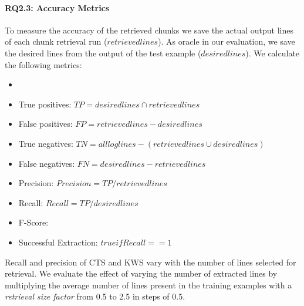 \documentclass[\myrootdir/main.tex]{subfiles}
\begin{document}
\paragraph{RQ2.3: Accuracy Metrics}
To measure the accuracy of the retrieved chunks we save the actual output lines of each chunk retrieval run ($retrievedlines$).
As oracle in our evaluation, we save the desired lines from the output of the test example ($desiredlines$).
We calculate the following metrics:
\begin{itemize}
	\item {}
	\item True positives: $TP = desiredlines \cap retrievedlines$
	\item False positives: $FP = retrievedlines - desiredlines$
	\item True negatives: $TN = allloglines - (retrievedlines \cup desiredlines)$
	\item False negatives: $FN = desiredlines - retrievedlines$
	\item Precision: $Precision = TP / retrievedlines$
	\item Recall: $Recall = TP / desiredlines$
	\item F-Score:
	\item Successful Extraction: $true if Recall == 1$
\end{itemize}


Recall and precision of CTS and KWS vary with the number of lines selected for retrieval.
We evaluate the effect of varying the number of extracted lines by multiplying the average number of lines present in the training examples with a \emph{retrieval size factor} from 0.5 to 2.5 in steps of 0.5.
\end{document}
